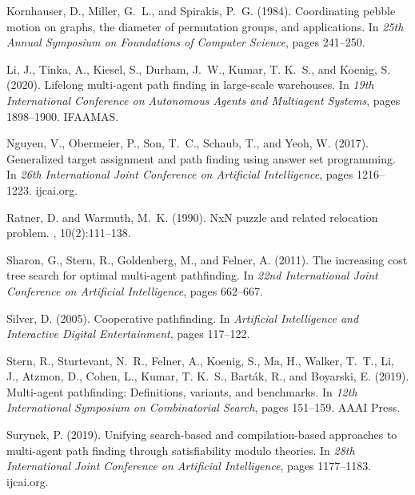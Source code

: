 \begin{thebibliography}{}
Kornhauser, D., Miller, G.~L., and Spirakis, P.~G. (1984).
\newblock Coordinating pebble motion on graphs, the diameter of permutation groups, and applications.
\newblock In {\em 25th Annual Symposium on Foundations of Computer Science}, pages 241--250.

Li, J., Tinka, A., Kiesel, S., Durham, J.~W., Kumar, T. K.~S., and Koenig, S. (2020).
\newblock Lifelong multi-agent path finding in large-scale warehouses.
\newblock In
{\em 19th International Conference on Autonomous Agents and Multiagent Systems},
pages 1898--1900.
IFAAMAS. %

Nguyen, V., Obermeier, P., Son, T.~C., Schaub, T., and Yeoh, W. (2017).
\newblock Generalized target assignment and path finding using answer set programming.
\newblock In
{\em 26th International Joint Conference on Artificial Intelligence},
pages 1216--1223. ijcai.org.

Ratner, D. and Warmuth, M.~K. (1990).
\newblock NxN puzzle and related relocation problem.
, 10(2):111--138.

Sharon, G., Stern, R., Goldenberg, M., and Felner, A. (2011).
\newblock The increasing cost tree search for optimal multi-agent pathfinding.
\newblock In {\em 22nd International Joint Conference on Artificial Intelligence},
pages 662--667.

Silver, D. (2005).
\newblock Cooperative pathfinding.
\newblock In {\em Artificial Intelligence and Interactive Digital Entertainment},
pages 117--122.

Stern, R., Sturtevant, N.~R., Felner, A., Koenig, S., Ma, H., Walker, T.~T.,
  Li, J., Atzmon, D., Cohen, L., Kumar, T. K.~S., Bart{\'{a}}k, R., and
  Boyarski, E. (2019).
\newblock Multi-agent pathfinding: Definitions, variants, and benchmarks.
\newblock In
{\em 12th International Symposium on Combinatorial Search},
pages 151--159. {AAAI} Press.

Surynek, P. (2019).
\newblock Unifying search-based and compilation-based approaches to multi-agent path finding through satisfiability modulo theories.
\newblock In
{\em 28th International Joint Conference on Artificial Intelligence},
pages 1177--1183. ijcai.org.


\end{thebibliography}
